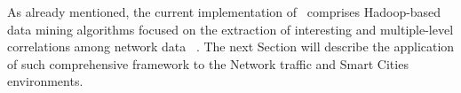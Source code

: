 As already mentioned, the current implementation of \Nemico\ comprises Hadoop-based data mining algorithms focused on the extraction of interesting and multiple-level correlations among network data ~\cite{6924449}. The next Section will describe the application of such comprehensive framework to the Network traffic and Smart Cities environments.


%
%

